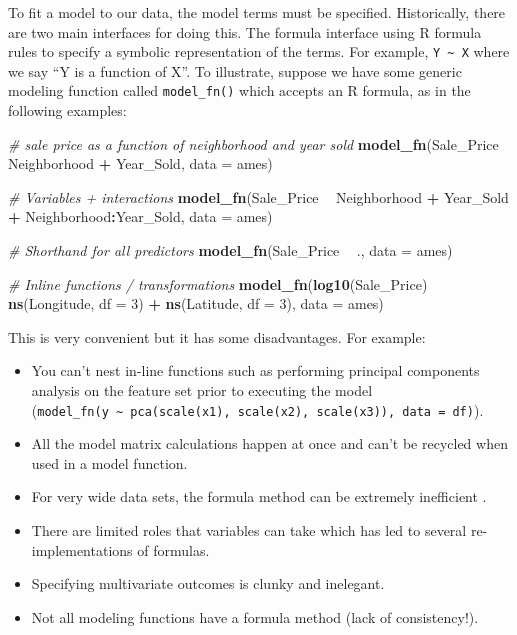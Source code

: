 \documentclass[]{krantz}
\makeatletter
\newenvironment{Shaded}{\begin{snugshade}}{\end{snugshade}}
\newcommand{\CommentTok}[1]{\textcolor[rgb]{0.37,0.37,0.37}{\textit{#1}}}
\newcommand{\DataTypeTok}[1]{\textcolor[rgb]{0.27,0.27,0.27}{#1}}
\newcommand{\DecValTok}[1]{\textcolor[rgb]{0.06,0.06,0.06}{#1}}
\newcommand{\KeywordTok}[1]{\textcolor[rgb]{0.27,0.27,0.27}{\textbf{#1}}}
\newcommand{\NormalTok}[1]{#1}
\newcommand{\OperatorTok}[1]{\textcolor[rgb]{0.43,0.43,0.43}{\textbf{#1}}}
\newcommand{\StringTok}[1]{\textcolor[rgb]{0.5,0.5,0.5}{#1}}
\providecommand{\tightlist}{%
  \setlength{\itemsep}{0pt}\setlength{\parskip}{0pt}}
\newenvironment{kframe}{%
\medskip{}
\setlength{\fboxsep}{.8em}
 \def\at@end@of@kframe{}%
 \ifinner\ifhmode%
  \def\at@end@of@kframe{\end{minipage}}%
  \begin{minipage}{\columnwidth}%
 \fi\fi%
 \def\FrameCommand##1{\hskip\@totalleftmargin \hskip-\fboxsep
 \colorbox{shadecolor}{##1}\hskip-\fboxsep
     \hskip-\linewidth \hskip-\@totalleftmargin \hskip\columnwidth}%
 \MakeFramed {\advance\hsize-\width
   \@totalleftmargin\z@ \linewidth\hsize
   \@setminipage}}%
 {\par\unskip\endMakeFramed%
 \at@end@of@kframe}
\renewenvironment{Shaded}{\begin{kframe}}{\end{kframe}}
\makeatother
\begin{document}
To fit a model to our data, the model terms must be specified. Historically, there are two main interfaces for doing this. The formula interface using R formula rules to specify a symbolic representation of the terms. For example, \texttt{Y\ \textasciitilde{}\ X} where we say ``Y is a function of X''. To illustrate, suppose we have some generic modeling function called \texttt{model\_fn()} which accepts an R formula, as in the following examples:

\begin{Shaded}
\begin{Highlighting}[]
\CommentTok{# sale price as a function of neighborhood and year sold}
\KeywordTok{model_fn}\NormalTok{(Sale_Price }\OperatorTok{~}\StringTok{ }\NormalTok{Neighborhood }\OperatorTok{+}\StringTok{ }\NormalTok{Year_Sold, }\DataTypeTok{data =}\NormalTok{ ames)}

\CommentTok{# Variables + interactions}
\KeywordTok{model_fn}\NormalTok{(Sale_Price }\OperatorTok{~}\StringTok{ }\NormalTok{Neighborhood }\OperatorTok{+}\StringTok{ }\NormalTok{Year_Sold }\OperatorTok{+}\StringTok{ }
\StringTok{           }\NormalTok{Neighborhood}\OperatorTok{:}\NormalTok{Year_Sold, }\DataTypeTok{data =}\NormalTok{ ames)}

\CommentTok{# Shorthand for all predictors}
\KeywordTok{model_fn}\NormalTok{(Sale_Price }\OperatorTok{~}\StringTok{ }\NormalTok{., }\DataTypeTok{data =}\NormalTok{ ames)}

\CommentTok{# Inline functions / transformations}
\KeywordTok{model_fn}\NormalTok{(}\KeywordTok{log10}\NormalTok{(Sale_Price) }\OperatorTok{~}\StringTok{ }\KeywordTok{ns}\NormalTok{(Longitude, }\DataTypeTok{df =} \DecValTok{3}\NormalTok{) }\OperatorTok{+}\StringTok{ }
\StringTok{           }\KeywordTok{ns}\NormalTok{(Latitude, }\DataTypeTok{df =} \DecValTok{3}\NormalTok{), }\DataTypeTok{data =}\NormalTok{ ames)}
\end{Highlighting}
\end{Shaded}

This is very convenient but it has some disadvantages. For example:

\begin{itemize}
\tightlist
\item
  You can't nest in-line functions such as performing principal components analysis on the feature set prior to executing the model (\texttt{model\_fn(y\ \textasciitilde{}\ pca(scale(x1),\ scale(x2),\ scale(x3)),\ data\ =\ df)}).
\item
  All the model matrix calculations happen at once and can't be recycled when used in a model function.
\item
  For very wide data sets, the formula method can be extremely inefficient \citep{kuhnFormula}.
\item
  There are limited roles that variables can take which has led to several re-implementations of formulas.
\item
  Specifying multivariate outcomes is clunky and inelegant.
\item
  Not all modeling functions have a formula method (lack of consistency!).
\end{itemize}
\end{document}
